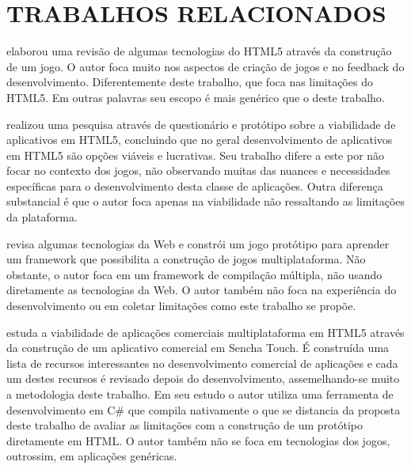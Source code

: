 
\section{TRABALHOS RELACIONADOS}
\citet{crossPlatformMobileGame} elaborou uma revisão de algumas
tecnologias do HTML5 através da construção de um jogo. O autor foca
muito nos aspectos de criação de jogos e no feedback do desenvolvimento.
Diferentemente deste trabalho, que foca nas limitações do HTML5. Em
outras palavras seu escopo é mais genérico que o deste trabalho.

\citet{aSeriousContender} realizou uma pesquisa através de questionário
e protótipo sobre a viabilidade de aplicativos em HTML5, concluindo que
no geral desenvolvimento de aplicativos em HTML5 são opções viáveis
e lucrativas. Seu trabalho difere a este por não focar no contexto dos
jogos, não observando muitas das nuances e necessidades específicas
para o desenvolvimento desta classe de aplicações. Outra diferença substancial é que o
autor foca apenas na viabilidade não ressaltando as limitações da
plataforma.

\citet{crossPlatformMobileGameDevelopment} revisa algumas tecnologias
da Web e constrói um jogo protótipo para aprender um framework que
possibilita a construção de jogos multiplataforma. Não obstante,
o autor foca em um framework de compilação múltipla, não usando
diretamente as tecnologias da Web. O autor também não foca na experiência do
desenvolvimento ou em coletar limitações como este trabalho se propõe.

\citet{viabilityBusinessApplications} estuda a viabilidade de
aplicações comerciais multiplataforma em HTML5 através da
construção de um aplicativo comercial em Sencha Touch. É construída
uma lista de recursos interessantes no desenvolvimento comercial
de aplicações e cada um destes recursos é revisado depois do
desenvolvimento, assemelhando-se muito a metodologia deste trabalho. Em
seu estudo o autor utiliza uma ferramenta de desenvolvimento em C\# que
compila nativamente o que se distancia da proposta deste trabalho de
avaliar as limitações com a construção de um protótipo diretamente
em HTML. O autor também não se foca em tecnologias dos jogos,
outrossim, em aplicações genéricas.


